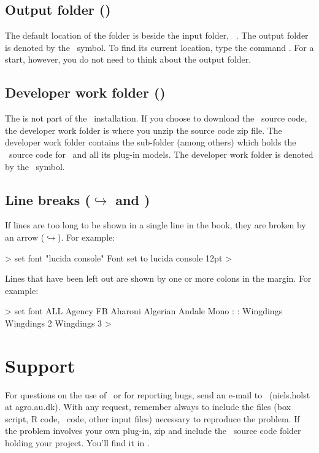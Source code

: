 \subsection{Output folder (\outputfolder)}
The default location of the  folder is beside the input folder, \ie\ . The output folder is denoted by the \outputfolder\ symbol. To find its current location, type the command . For a start, however, you do not need to think about the output folder.  

\subsection{Developer work folder (\devhome)}
The  is not part of the \US\ installation. If you choose to download the \US\ source code, the developer work folder is where you unzip the source code zip file. The developer work folder contains the  sub-folder (among others) which holds the \CPP\ source code for \US\ and all its plug-in models. The developer work folder is denoted by the \devhome\ symbol.

\subsection{Line breaks (\(\hookrightarrow\) and \code{:})}
If lines are too long to be shown in a single line in the book, they are broken by an arrow (\(\hookrightarrow\)). For example:

\begin{usdialog}
> set font "lucida console"
Font set to lucida console 12pt %
> 
\end{usdialog}

Lines that have been left out are shown by one or more colons in the margin. For example:

\begin{usdialog}
> set font ALL
Agency FB
Aharoni
Algerian
Andale Mono
:
:
Wingdings
Wingdings 2
Wingdings 3
> 
\end{usdialog}

\section{Support}
For questions on the use of \US\ or for reporting bugs, send an e-mail to \USS\ (niels.holst at agro.au.dk). With any request, remember always to include the files (box script, R code, \CPP\ code, other input files) necessary to reproduce the problem. If the problem involves your own plug-in, zip and include the \CPP\ source code folder holding your project. You'll find it in .

